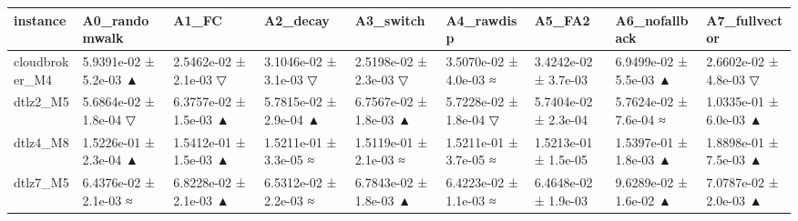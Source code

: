 \begin{tabular}{lllllllll}
\toprule
instance & A0\_randomwalk & A1\_FC & A2\_decay & A3\_switch & A4\_rawdisp & A5\_FA2 & A6\_nofallback & A7\_fullvector \\
\midrule
cloudbroker\_M4 & 5.9391e-02 ± 5.2e-03 ▲ & 2.5462e-02 ± 2.1e-03 ▽ & 3.1046e-02 ± 3.1e-03 ▽ & 2.5198e-02 ± 2.3e-03 ▽ & 3.5070e-02 ± 4.0e-03 ≈ & 3.4242e-02 ± 3.7e-03 & 6.9499e-02 ± 5.5e-03 ▲ & 2.6602e-02 ± 4.8e-03 ▽ \\
dtlz2\_M5 & 5.6864e-02 ± 1.8e-04 ▽ & 6.3757e-02 ± 1.5e-03 ▲ & 5.7815e-02 ± 2.9e-04 ▲ & 6.7567e-02 ± 1.8e-03 ▲ & 5.7228e-02 ± 1.8e-04 ▽ & 5.7404e-02 ± 2.3e-04 & 5.7624e-02 ± 7.6e-04 ≈ & 1.0335e-01 ± 6.0e-03 ▲ \\
dtlz4\_M8 & 1.5226e-01 ± 2.3e-04 ▲ & 1.5412e-01 ± 1.5e-03 ▲ & 1.5211e-01 ± 3.3e-05 ≈ & 1.5119e-01 ± 2.1e-03 ≈ & 1.5211e-01 ± 3.7e-05 ≈ & 1.5213e-01 ± 1.5e-05 & 1.5397e-01 ± 1.8e-03 ▲ & 1.8898e-01 ± 7.5e-03 ▲ \\
dtlz7\_M5 & 6.4376e-02 ± 2.1e-03 ≈ & 6.8228e-02 ± 2.1e-03 ▲ & 6.5312e-02 ± 2.2e-03 ≈ & 6.7843e-02 ± 1.8e-03 ▲ & 6.4223e-02 ± 1.1e-03 ≈ & 6.4648e-02 ± 1.9e-03 & 9.6289e-02 ± 1.6e-02 ▲ & 7.0787e-02 ± 2.0e-03 ▲ \\
\bottomrule
\end{tabular}
